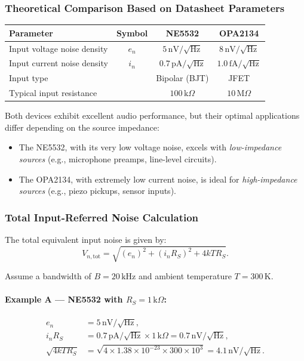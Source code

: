 \subsubsection{Theoretical Comparison Based on Datasheet Parameters}
\begin{center}
\begin{tabular}{|l|c|c|c|}
\hline
\textbf{Parameter} & \textbf{Symbol} & \textbf{NE5532} & \textbf{OPA2134} \\
\hline
Input voltage noise density & $e_n$ & $5\,\mathrm{nV}/\sqrt{\mathrm{Hz}}$ & $8\,\mathrm{nV}/\sqrt{\mathrm{Hz}}$ \\
Input current noise density & $i_n$ & $0.7\,\mathrm{pA}/\sqrt{\mathrm{Hz}}$ & $1.0\,\mathrm{fA}/\sqrt{\mathrm{Hz}}$ \\
Input type &  & Bipolar (BJT) & JFET \\
Typical input resistance &  & $100\,\text{k}\Omega$ & $10\,\text{M}\Omega$ \\
\hline
\end{tabular}
\end{center}

Both devices exhibit excellent audio performance, but their optimal applications differ depending on the source impedance:
\begin{itemize}
  \item The NE5532, with its very low voltage noise, excels with \emph{low-impedance sources} (e.g., microphone preamps, line-level circuits).
  \item The OPA2134, with extremely low current noise, is ideal for \emph{high-impedance sources} (e.g., piezo pickups, sensor inputs).
\end{itemize}

\subsubsection{Total Input-Referred Noise Calculation}

The total equivalent input noise is given by:
\[
V_{n,\text{tot}} = \sqrt{(e_n)^2 + (i_n R_S)^2 + 4kTR_S}.
\]

Assume a bandwidth of $B = 20\,\text{kHz}$ and ambient temperature $T = 300\,\text{K}$.

\paragraph{Example A — NE5532 with $R_S = 1\,\text{k}\Omega$:}
\[
\begin{aligned}
e_n &= 5\,\mathrm{nV}/\sqrt{\mathrm{Hz}}, \\
i_n R_S &= 0.7\,\mathrm{pA}/\sqrt{\mathrm{Hz}} \times 1\,\text{k}\Omega = 0.7\,\mathrm{nV}/\sqrt{\mathrm{Hz}}, \\
\sqrt{4kTR_S} &= \sqrt{4 \times 1.38\times10^{-23} \times 300 \times 10^3} = 4.1\,\mathrm{nV}/\sqrt{\mathrm{Hz}}.
\end{aligned}
\]

